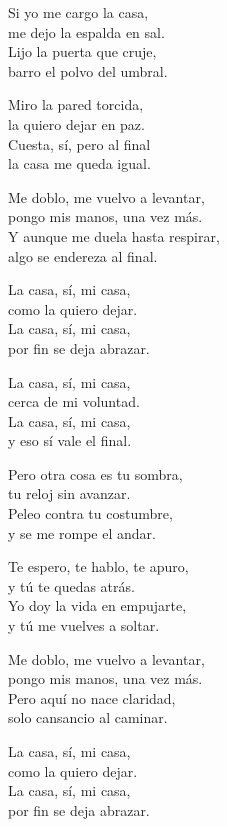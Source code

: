 \begin{lyrics}

Si yo me cargo la casa,\\
me dejo la espalda en sal.\\
Lijo la puerta que cruje,\\
barro el polvo del umbral.

Miro la pared torcida,\\
la quiero dejar en paz.\\
Cuesta, sí, pero al final\\
la casa me queda igual.

Me doblo, me vuelvo a levantar,\\
pongo mis manos, una vez más.\\
Y aunque me duela hasta respirar,\\
algo se endereza al final.

La casa, sí, mi casa,\\
como la quiero dejar.\\
La casa, sí, mi casa,\\
por fin se deja abrazar.

La casa, sí, mi casa,\\
cerca de mi voluntad.\\
La casa, sí, mi casa,\\
y eso sí vale el final.

Pero otra cosa es tu sombra,\\
tu reloj sin avanzar.\\
Peleo contra tu costumbre,\\
y se me rompe el andar.

Te espero, te hablo, te apuro,\\
y tú te quedas atrás.\\
Yo doy la vida en empujarte,\\
y tú me vuelves a soltar.

Me doblo, me vuelvo a levantar,\\
pongo mis manos, una vez más.\\
Pero aquí no nace claridad,\\
solo cansancio al caminar.

La casa, sí, mi casa,\\
como la quiero dejar.\\
La casa, sí, mi casa,\\
por fin se deja abrazar.


\end{lyrics}
